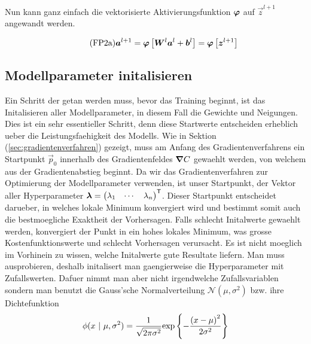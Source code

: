 Nun kann ganz einfach die vektorisierte Aktivierungsfunktion $\bm{\varphi}$ auf
$\vec{z}^{l+1}$ angewandt werden.

\begin{equation}\tag{FP2a}\label{eq:aktivierung_matrix}
  \bm{a}^{l+1} = \bm{\varphi} \left[\bm{W}^{l} \bm{a}^{l} + \bm{b}^{l} \right] = \bm{\varphi} \left[ \bm{z}^{l+1} \right]
\end{equation}

\para{}
\cite{Nielsen}

\subsection{Modellparameter initalisieren}\label{sec:parameter_initalisieren}
Ein Schritt der getan werden muss, bevor das Training beginnt, ist das
Initalisieren aller Modellparameter, in diesem Fall die Gewichte und Neigungen.
Dies ist ein sehr essentieller Schritt, denn diese Startwerte entscheiden
erheblich ueber die Leistungsfaehigkeit des Modells.
\para{}
Wie in Sektion (\ref{sec:gradientenverfahren}) gezeigt, muss am Anfang des
Gradientenverfahrens ein Startpunkt $\vec{p}_0$ innerhalb des Gradientenfeldes
$\bm{\nabla}C$ gewaehlt werden, von welchem aus der Gradientenabstieg beginnt.
Da wir das Gradientenverfahren zur Optimierung der Modellparameter verwenden,
ist unser Startpunkt, der Vektor aller Hyperparameter
$\bm{\lambda} = \begin{pmatrix} \lambda_1 & \cdots & \lambda_n \end{pmatrix}^{\mathsf{T}}$.
Dieser Startpunkt entscheidet darueber, in welches lokale Minimum konvergiert
wird und bestimmt somit auch die bestmoegliche Exaktheit der Vorhersagen. Falls
schlecht Initalwerte gewaehlt werden, konvergiert der Punkt in ein hohes lokales
Minimum, was grosse Kostenfunktionswerte und schlecht Vorhersagen verursacht.
\para{}
Es ist nicht moeglich im Vorhinein zu wissen, welche Initalwerte gute Resultate
liefern. Man muss ausprobieren, deshalb initalisert man gaengierweise die
Hyperparameter mit Zufallswerten. Dafuer nimmt man aber nicht irgendwelche
Zufallsvariablen sondern man benutzt die Gauss'sche Normalverteilung
$\mathcal{N}(\mu,\sigma^2)$ bzw. ihre Dichtefunktion
\[\ds \phi(x\ |\ \mu,\sigma^2) = \frac{1}{\sqrt{2\pi\sigma^2}} \text{exp} \left\{-\frac{{(x-\mu)}^2}{2\sigma^2}\right\} \]
\para{}


